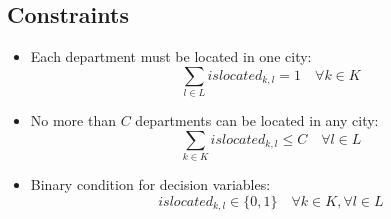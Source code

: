 \documentclass{article}
\begin{document}
\subsection*{Constraints}
\begin{itemize}
    \item Each department must be located in one city:
    \[
    \sum_{l \in L} islocated_{k, l} = 1 \quad \forall k \in K
    \]
    
    \item No more than \( C \) departments can be located in any city:
    \[
    \sum_{k \in K} islocated_{k, l} \leq C \quad \forall l \in L
    \]
    
    \item Binary condition for decision variables:
    \[
    islocated_{k, l} \in \{0, 1\} \quad \forall k \in K, \forall l \in L
    \]
\end{itemize}
\end{document}
